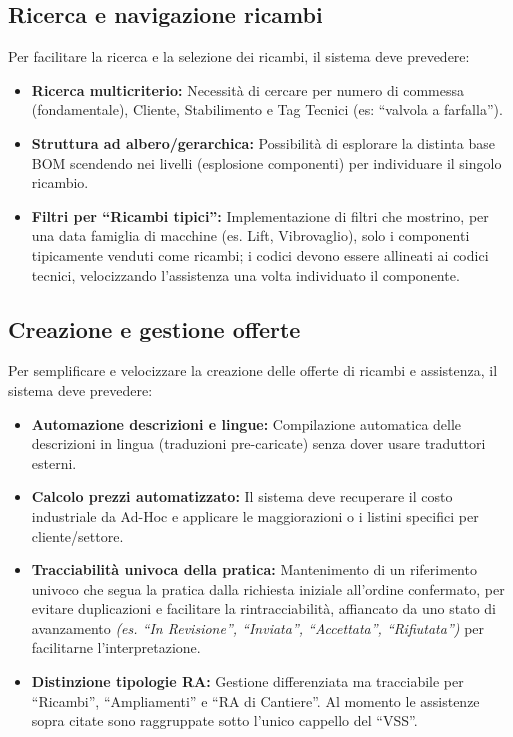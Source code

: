 \subsection{Ricerca e navigazione ricambi}
Per facilitare la ricerca e la selezione dei ricambi, il sistema deve prevedere:
\begin{itemize}
      \item \textbf{Ricerca multicriterio:} Necessità di cercare per numero di commessa (fondamentale),
            Cliente, Stabilimento e Tag Tecnici (es: ``valvola a farfalla'').
      \item \textbf{Struttura ad albero/gerarchica:} Possibilità di esplorare la distinta base \ac{BOM}
            scendendo nei livelli (esplosione componenti) per individuare il singolo ricambio.
      \item \textbf{Filtri per ``Ricambi tipici'':} Implementazione di filtri che mostrino, per una data
            famiglia di macchine (es. Lift, Vibrovaglio), solo i componenti tipicamente venduti come ricambi;
            i codici devono essere allineati ai codici tecnici, velocizzando l'assistenza una volta individuato il componente.
\end{itemize}

\subsection{Creazione e gestione offerte}
Per semplificare e velocizzare la creazione delle offerte di ricambi e assistenza, il sistema deve prevedere:
\begin{itemize}
      \item \textbf{Automazione descrizioni e lingue:} Compilazione automatica delle descrizioni in lingua
            (traduzioni pre-caricate) senza dover usare traduttori esterni.
      \item \textbf{Calcolo prezzi automatizzato:} Il sistema deve recuperare il costo industriale da Ad-Hoc e
            applicare le maggiorazioni o i listini specifici per cliente/settore.
      \item \textbf{Tracciabilità univoca della pratica:} Mantenimento di un riferimento univoco che segua
            la pratica dalla richiesta iniziale all'ordine confermato, per evitare duplicazioni e facilitare la
            rintracciabilità, affiancato da uno stato di avanzamento \textit{(es. ``In Revisione'', ``Inviata'', ``Accettata'',
                  ``Rifiutata'')} per facilitarne l'interpretazione.
      \item \textbf{Distinzione tipologie RA:} Gestione differenziata ma tracciabile per ``Ricambi'',
            ``Ampliamenti'' e ``RA di Cantiere''. Al momento le assistenze sopra citate sono raggruppate sotto
            l'unico cappello del ``VSS''.
\end{itemize}

